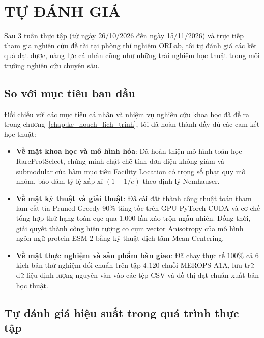 \chapter{TỰ ĐÁNH GIÁ}
\label{chap:tu_danh_gia}

Sau 3 tuần thực tập (từ ngày 26/10/2026 đến ngày 15/11/2026) và trực tiếp tham gia nghiên cứu đề tài tại phòng thí nghiệm ORLab, tôi tự đánh giá các kết quả đạt được, năng lực cá nhân cũng như những trải nghiệm học thuật trong môi trường nghiên cứu chuyên sâu.

\section{So với mục tiêu ban đầu}
\label{sec:danh_gia_muc_tieu}

Đối chiếu với các mục tiêu cá nhân và nhiệm vụ nghiên cứu khoa học đã đề ra trong chương~\ref{chap:ke_hoach_lich_trinh}, tôi đã hoàn thành đầy đủ các cam kết học thuật:

\begin{itemize}
    \item \textbf{Về mặt khoa học và mô hình hóa}: Đã hoàn thiện mô hình toán học RareProtSelect, chứng minh chặt chẽ tính đơn điệu không giảm và submodular của hàm mục tiêu Facility Location có trọng số phạt quy mô nhóm, bảo đảm tỷ lệ xấp xỉ $(1 - 1/e)$ theo định lý Nemhauser.
    \item \textbf{Về mặt kỹ thuật và giải thuật}: Đã cài đặt thành công thuật toán tham lam cắt tỉa Pruned Greedy 90\% tăng tốc trên GPU PyTorch CUDA và cơ chế tổng hợp thứ hạng toàn cục qua $1.000$ lần xáo trộn ngẫu nhiên. Đồng thời, giải quyết thành công hiện tượng co cụm vector Anisotropy của mô hình ngôn ngữ protein ESM-2 bằng kỹ thuật dịch tâm Mean-Centering.
    \item \textbf{Về mặt thực nghiệm và sản phẩm bàn giao}: Đã chạy thực tế $100\%$ cả 6 kịch bản thử nghiệm đối chuẩn trên tập $4.120$ chuỗi MEROPS A1A, lưu trữ dữ liệu định lượng nguyên văn vào các tệp CSV và đồ thị đạt chuẩn xuất bản học thuật.
\end{itemize}

\section{Tự đánh giá hiệu suất trong quá trình thực tập}
\label{sec:danh_gia_hieu_suat}

